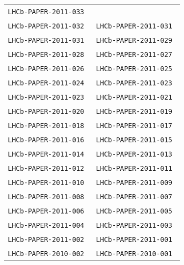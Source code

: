 \begin{center}
\begin{longtable}{ll}
\texttt{LHCb-PAPER-2011-033}~\cite{LHCb-PAPER-2011-033} \\
\texttt{LHCb-PAPER-2011-032}~\cite{LHCb-PAPER-2011-032} & 
\texttt{LHCb-PAPER-2011-031}~\cite{LHCb-PAPER-2011-031} \\
\texttt{LHCb-PAPER-2011-031}~\cite{LHCb-PAPER-2011-030} &
\texttt{LHCb-PAPER-2011-029}~\cite{LHCb-PAPER-2011-029} \\
\texttt{LHCb-PAPER-2011-028}~\cite{LHCb-PAPER-2011-028} &
\texttt{LHCb-PAPER-2011-027}~\cite{LHCb-PAPER-2011-027} \\
\texttt{LHCb-PAPER-2011-026}~\cite{LHCb-PAPER-2011-026} &
\texttt{LHCb-PAPER-2011-025}~\cite{LHCb-PAPER-2011-025} \\
\texttt{LHCb-PAPER-2011-024}~\cite{LHCb-PAPER-2011-024} &
\texttt{LHCb-PAPER-2011-023}~\cite{LHCb-PAPER-2011-023} \\
\texttt{LHCb-PAPER-2011-023}~\cite{LHCb-PAPER-2011-022} &
\texttt{LHCb-PAPER-2011-021}~\cite{LHCb-PAPER-2011-021} \\
\texttt{LHCb-PAPER-2011-020}~\cite{LHCb-PAPER-2011-020} &
\texttt{LHCb-PAPER-2011-019}~\cite{LHCb-PAPER-2011-019} \\
\texttt{LHCb-PAPER-2011-018}~\cite{LHCb-PAPER-2011-018} &
\texttt{LHCb-PAPER-2011-017}~\cite{LHCb-PAPER-2011-017} \\
\texttt{LHCb-PAPER-2011-016}~\cite{LHCb-PAPER-2011-016} &
\texttt{LHCb-PAPER-2011-015}~\cite{LHCb-PAPER-2011-015} \\
\texttt{LHCb-PAPER-2011-014}~\cite{LHCb-PAPER-2011-014} &
\texttt{LHCb-PAPER-2011-013}~\cite{LHCb-PAPER-2011-013} \\
\texttt{LHCb-PAPER-2011-012}~\cite{LHCb-PAPER-2011-012} &
\texttt{LHCb-PAPER-2011-011}~\cite{LHCb-PAPER-2011-011} \\
\texttt{LHCb-PAPER-2011-010}~\cite{LHCb-PAPER-2011-010} &
\texttt{LHCb-PAPER-2011-009}~\cite{LHCb-PAPER-2011-009} \\
\texttt{LHCb-PAPER-2011-008}~\cite{LHCb-PAPER-2011-008} &
\texttt{LHCb-PAPER-2011-007}~\cite{LHCb-PAPER-2011-007} \\
\texttt{LHCb-PAPER-2011-006}~\cite{LHCb-PAPER-2011-006} &
\texttt{LHCb-PAPER-2011-005}~\cite{LHCb-PAPER-2011-005} \\
\texttt{LHCb-PAPER-2011-004}~\cite{LHCb-PAPER-2011-004} &
\texttt{LHCb-PAPER-2011-003}~\cite{LHCb-PAPER-2011-003} \\
\texttt{LHCb-PAPER-2011-002}~\cite{LHCb-PAPER-2011-002} &
\texttt{LHCb-PAPER-2011-001}~\cite{LHCb-PAPER-2011-001} \\
\hline
\texttt{LHCb-PAPER-2010-002}~\cite{LHCb-PAPER-2010-002} &
\texttt{LHCb-PAPER-2010-001}~\cite{LHCb-PAPER-2010-001} \\
\hline
\end{longtable}
\end{center}

